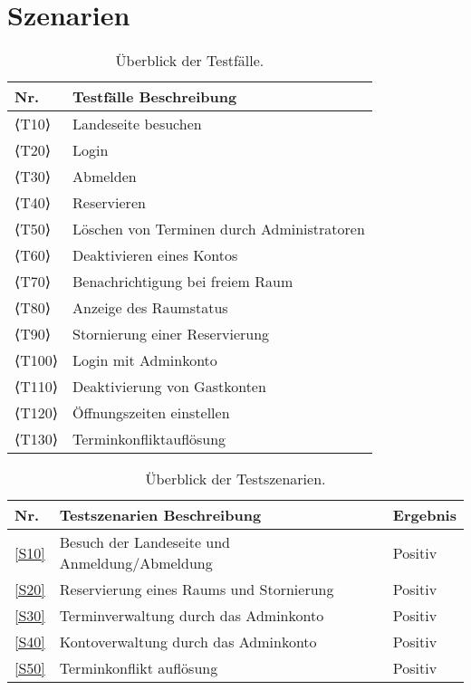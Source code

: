 
\chapter{Szenarien}
\label{ch:scenarios}

\begin{table}[htbp]
    \centering
    \begin{tabularx}{\textwidth}{ l|X }
        \textbf{Nr.} & \textbf{Testfälle Beschreibung} \\ \hline\hline
        ⟨T10⟩ & Landeseite besuchen \\
        ⟨T20⟩ & Login \\
        ⟨T30⟩ & Abmelden \\
        ⟨T40⟩ & Reservieren \\
        ⟨T50⟩ & Löschen von Terminen durch Administratoren \\
        ⟨T60⟩ & Deaktivieren eines Kontos \\
        ⟨T70⟩ & Benachrichtigung bei freiem Raum \\
        ⟨T80⟩ & Anzeige des Raumstatus \\
        ⟨T90⟩ & Stornierung einer Reservierung \\
        ⟨T100⟩ & Login mit Adminkonto \\
        ⟨T110⟩ & Deaktivierung von Gastkonten \\
        ⟨T120⟩ & Öffnungszeiten einstellen \\
        ⟨T130⟩ & Terminkonfliktauflösung \\
    \end{tabularx}
    \caption{Überblick der Testfälle.}
    \label{tab:test_table}
\end{table}

\begin{table}[htbp]
    \centering
    \begin{tabularx}{\textwidth}{ l|X|l }
        \textbf{Nr.} & \textbf{Testszenarien Beschreibung} & \textbf{Ergebnis} \\ \hline\hline
        \ref{S10} & Besuch der Landeseite und Anmeldung/Abmeldung & Positiv\\
        \ref{S20} & Reservierung eines Raums und Stornierung & Positiv\\
        \ref{S30} & Terminverwaltung durch das Adminkonto & Positiv\\
        \ref{S40} & Kontoverwaltung durch das Adminkonto & Positiv\\
        \ref{S50} & Terminkonflikt auflösung & Positiv\\
    \end{tabularx}
    \caption{Überblick der Testszenarien.}
    \label{tab:scenario_table}
\end{table}

